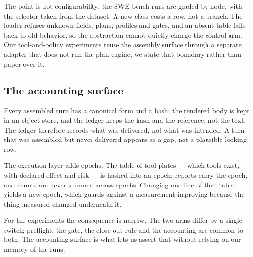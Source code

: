 The point is not configurability: the SWE-bench runs are graded by node, with
the selector taken from the dataset. A new class costs a row, not a branch. The
loader refuses unknown fields, plans, profiles and gates, and an absent table
falls back to old behavior, so the abstraction cannot quietly change the
control arm. Our tool-and-policy experiments reuse the assembly surface through
a separate adapter that does not run the plan engine; we state that boundary
rather than paper over it.

\subsection{The accounting surface}

Every assembled turn has a canonical form and a hash; the rendered body is kept
in an object store, and the ledger keeps the hash and the reference, not the
text. The ledger therefore records what was delivered, not what was intended. A
turn that was assembled but never delivered appears as a gap, not a
plausible-looking row.

The execution layer adds epochs. The table of tool plates --- which tools exist,
with declared effect and risk --- is hashed into an epoch; reports carry the
epoch, and counts are never summed across epochs. Changing one line of that
table yields a new epoch, which guards against a measurement improving because
the thing measured changed underneath it.

For the experiments the consequence is narrow. The two arms differ by a single
switch; preflight, the gate, the close-out rule and the accounting are common
to both. The accounting surface is what lets us assert that without relying on
our memory of the runs.

